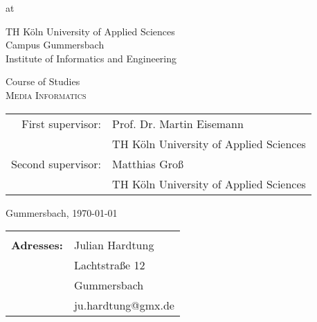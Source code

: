 \begin{titlepage}
\begin{center}
\begin{large}
at\\
\vspace{0.2cm}
\begin{scshape}
TH Köln University of Applied Sciences\\
Campus Gummersbach\\
Institute of Informatics and Engineering\\
\end{scshape}
\end{large}

\vspace{0.4cm}

\begin{large}
Course of Studies\\ 
\vspace{0.2cm}
\textsc{Media Informatics}
\end{large}

\vspace{1.0cm}

\begin{tabular}{rl}
	First supervisor: 	& Prof. Dr. Martin Eisemann\\
				& \small TH Köln University of Applied Sciences\\[1.0em]
	Second supervisor: 	& Matthias Groß\\
				& \small TH Köln University of Applied Sciences\\
\end{tabular}

\vspace{0.6cm}

\begin{large}
	Gummersbach, \today
\end{large}

\end{center}

\newpage
\thispagestyle{empty}


\begin{center}
\begin{tabular}{rl}
							&  \\[32.0em]
							
\large \textbf{Adresses:}				&  	\quad Julian Hardtung\\
							&  	\quad Lachtstraße 12 \\
							&	\quad 51645 Gummersbach\\
							&  	\quad ju.hardtung@gmx.de\\[2.0em]
							

\end{tabular}
\end{center}
\end{titlepage}
